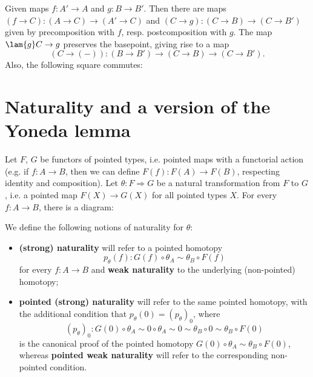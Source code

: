 \documentclass{article}
\newcommand{\pmap}{\to}
\renewcommand{\o}{\ensuremath{\circ}}
\begin{document}
\begin{lem}
  Given maps $f:A'\pmap A$ and $g:B\pmap B'$. Then there are maps
  $(f\pmap C):(A\pmap C)\pmap(A'\pmap C)$ and $(C\pmap g):(C\pmap B)\pmap(C\pmap B')$ given by
  precomposition with $f$, resp. postcomposition with $g$. The map $\lam{g}C\pmap g$ preserves the basepoint, giving rise to a map $$(C\pmap ({-})):(B\pmap B')\pmap(C\pmap B)\pmap(C\pmap B').$$
  Also, the following square commutes:
\begin{center}
\end{center}

\end{lem}

\section{Naturality and a version of the Yoneda lemma}

\begin{defn}\label{def:naturality}
	Let $F$, $G$ be functors of pointed types, i.e. pointed maps with a functorial action (e.g. if $f : A \to B$, then we can define $F(f) : F(A) \to F(B)$, respecting identity and composition). 
	Let $\theta : F \Rightarrow G$ be a natural transformation from $F$ to $G$, i.e. a pointed map $F(X) \to G(X)$ for all pointed types $X$. For every $f : A \to B$, there is a diagram:
	\begin{center}
	\end{center}
	We define the following notions of naturality for $\theta$:
	\begin{itemize}
		\item \textbf{(strong) naturality} will refer to a pointed homotopy
		\[p_\theta(f) : G(f) \o \theta_A \sim \theta_B \o F(f)\]
		for every $f : A \to B$ and \textbf{weak naturality} to the underlying (non-pointed) homotopy;
		\item \textbf{pointed (strong) naturality} will refer to the same pointed homotopy, with the additional condition that $p_\theta(0) = (p_\theta)_0$, where
		\[(p_\theta)_0 : G(0) \o \theta_A \sim 0 \o \theta_A \sim 0 \sim \theta_B \o 0 \sim \theta_B \o F(0)\]
		is the canonical proof of the pointed homotopy $G(0) \o \theta_A \sim \theta_B \o F(0)$, whereas \textbf{pointed weak naturality} will refer to the corresponding non-pointed condition.
	\end{itemize}
\end{defn}
\end{document}
